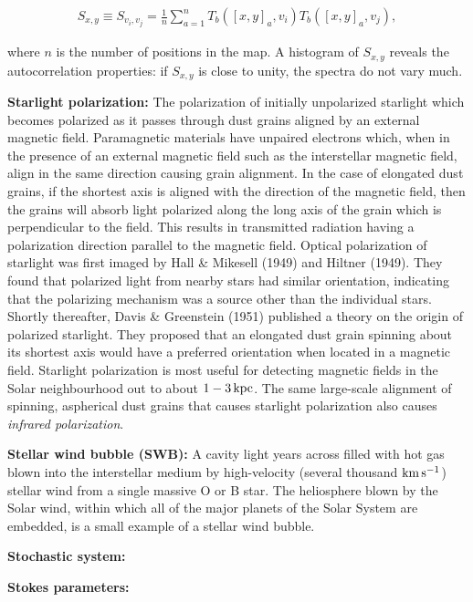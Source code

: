 \documentclass[a4paper,10pt]{article}
\begin{document}
\begin{align*}
    S_{x,y} \equiv S_{v_i,v_j} = \frac{1}{n}\sum_{a=1}^n T_b([x,y]_a,v_i)T_b([x,y]_a,v_j),
\end{align*}

{\noindent}where $n$ is the number of positions in the map. A histogram of $S_{x,y}$ reveals the autocorrelation properties: if $S_{x,y}$ is close to unity, the spectra do not vary much.

{\noindent}\textbf{Starlight polarization:} The polarization of initially unpolarized starlight which becomes polarized as it passes through dust grains aligned by an external magnetic field. Paramagnetic materials have unpaired electrons which, when in the presence of an external magnetic field such as the interstellar magnetic field, align in the same direction causing grain alignment. In the case of elongated dust grains, if the shortest axis is aligned with the direction of the magnetic field, then the grains will absorb light polarized along the long axis of the grain which is perpendicular to the field. This results in transmitted radiation having a polarization direction parallel to the magnetic field. Optical polarization of starlight was first imaged by Hall \& Mikesell (1949) and Hiltner (1949). They found that polarized light from nearby stars had similar orientation, indicating that the polarizing mechanism was a source other than the individual stars. Shortly thereafter, Davis \& Greenstein (1951) published a theory on the origin of polarized starlight. They proposed that an elongated dust grain spinning about its shortest axis would have a preferred orientation when located in a magnetic field. Starlight polarization is most useful for detecting magnetic fields in the Solar neighbourhood out to about $1-3\,{\rm kpc}$. The same large-scale alignment of spinning, aspherical dust grains that causes starlight polarization also causes \textit{infrared polarization}.

{\noindent}\textbf{Stellar wind bubble (SWB):} A cavity light years across filled with hot gas blown into the interstellar medium by high-velocity (several thousand ${\rm km\,s^{-1}}$) stellar wind from a single massive O or B star. The heliosphere blown by the Solar wind, within which all of the major planets of the Solar System are embedded, is a small example of a stellar wind bubble.

{\noindent}\textbf{Stochastic system:}

{\noindent}\textbf{Stokes parameters:}
\end{document}
